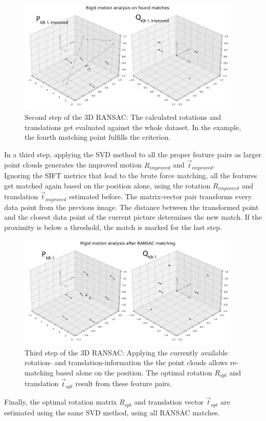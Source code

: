 \begin{figure}[H]
    \centering
    \includegraphics[width=0.95\textwidth]{images/ransac_3d_step2.pdf}
    \caption{Second step of the 3D RANSAC: The calculated rotations and translations get evaluated against the whole dataset. In the example, the fourth matching point fulfills the criterion.}
    \label{im:ransac2}
\end{figure}
 In a third step, applying the SVD method to all the proper feature pairs as larger point clouds generates the improved motion $R_{improved}$ and $\vec{t}_{improved}$. \\
Ignoring the SIFT metrics that lead to the brute force matching, all the features get matched again based on the position alone, using the rotation $R_{improved}$ and translation $\vec{t}_{improved}$ estimated before. The matrix-vector pair transforms every data point from the previous image. The distance between the transformed point and the closest data point of the current picture determines the new match. If the proximity is below a threshold, the match is marked for the last step.
\begin{figure}[H]
    \centering
    \includegraphics[width=0.95\textwidth]{images/ransac_3d_step3.pdf}
    \caption{Third step of the 3D RANSAC: Applying the currently available rotation- and translation-information the the point clouds allows re-matching based alone on the position. The optimal rotation $R_{opt}$ and translation $\vec{t}_{opt}$ result from these feature pairs.}
    \label{im:ransac3}
\end{figure}
Finally, the optimal rotation matrix $R_{opt}$ and translation vector $\vec{t}_{opt}$ are estimated using the same SVD method, using all RANSAC matches.
